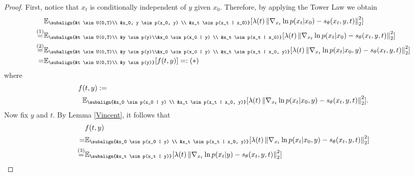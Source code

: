 \begin{proof}
    First, notice that $x_t$ is conditionally independent of $y$ given $x_0$. Therefore, by applying the Tower Law we obtain
    \begin{align*}
        &\mathbb{E}_{\subalign{&t \sim U(0,T)\\ &x_0, y \sim p(x_0, y) \\ &x_t \sim p(x_t | x_0)}} 
            [\lambda(t) \norm{\nabla_{x_t} \ln{p(x_t | x_0)} - s_\theta(x_t, y, t)}_2^2] \\
            \overset{(1)}{=}& \mathbb{E}_{\subalign{&t \sim U(0,T)\\ &y \sim p(y)\\&x_0 \sim p(x_0 | y) \\ &x_t \sim p(x_t | x_0)}} 
            [\lambda(t) \norm{\nabla_{x_t} \ln{p(x_t | x_0)} - s_\theta(x_t, y, t)}_2^2] \\
            \overset{(2)}{=}& \mathbb{E}_{\subalign{&t \sim U(0,T)\\ &y \sim p(y)\\&x_0 \sim p(x_0 | y) \\ &x_t \sim p(x_t | x_0, y)}} 
            [\lambda(t) \norm{\nabla_{x_t} \ln{p(x_t | x_0, y)} - s_\theta(x_t, y, t)}_2^2] \\ 
            =& \mathbb{E}_{\subalign{&t \sim U(0,T)\\ &y \sim p(y)}} 
            [f(t,y)] =: (*)
    \end{align*}
    where 
    \begin{align*}
        f&(t,y) := \\
        &\mathbb{E}_{\subalign{&x_0 \sim p(x_0 | y) \\ &x_t \sim p(x_t | x_0, y)}} [
        \lambda(t) \norm{\nabla_{x_t} \ln{p(x_t | x_0, y)} - s_\theta(x_t, y, t)}_2^2
    ].
    \end{align*}
    Now fix $y$ and $t$. By Lemma \ref{Vincent}, it follows that
    \begin{align*}
        &f(t,y) \\
        =&\mathbb{E}_{\subalign{&x_0 \sim p(x_0 | y) \\ &x_t \sim p(x_t | x_0, y)}} 
            [\lambda(t) \norm{\nabla_{x_t} \ln{p(x_t | x_0, y)} - s_\theta(x_t, y, t)}_2^2]\\
        \overset{(3)}{=}& \mathbb{E}_{\subalign{&x_t \sim p(x_t |  y)}} 
            [\lambda(t) \norm{\nabla_{x_t} \ln{p(x_t | y)} - s_\theta(x_t, y, t)}_2^2]\\
    \end{align*}

\end{proof}
